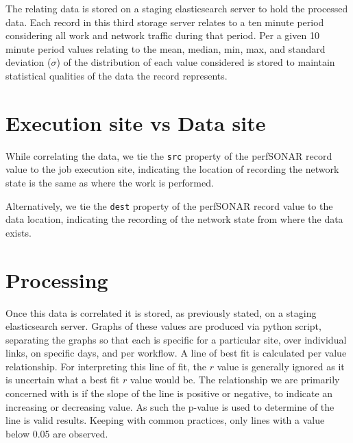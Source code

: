 \documentclass[print,ms]{nuthesis}
\begin{document}
The relating data is stored on a staging elasticsearch server to hold the processed data. Each record in this third storage server relates to a ten minute period considering all work and network traffic during that period. Per a given 10 minute period values relating to the mean, median, min, max, and standard deviation ($\sigma$) of the distribution of each value considered is stored to maintain statistical qualities of the data the record represents.
\section{Execution site vs Data site}
While correlating the data, we tie the \texttt{src} property of the perfSONAR record value to the job execution site, indicating the location of recording the network state is the same as where the work is performed.

Alternatively, we tie the \texttt{dest} property of the perfSONAR record value to the data location, indicating the recording of the network state from where the data exists.
\section{Processing}
Once this data is correlated it is stored, as previously stated, on a staging elasticsearch server. Graphs of these values are produced via python script, separating the graphs so that each is specific for a particular site, over individual links, on specific days, and per workflow. A line of best fit is calculated per value relationship. For interpreting this line of fit, the $r$ value is generally ignored as it is uncertain what a best fit $r$ value would be. The relationship we are primarily concerned with is if the slope of the line is positive or negative, to indicate an increasing or decreasing value. As such the p-value is used to determine of the line is valid results. Keeping with common practices, only lines with a value below 0.05 are observed.
\end{document}
